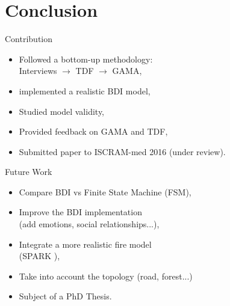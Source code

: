 \documentclass{beamer}
\begin{document}
  \section{Conclusion}

    \begin{frame}{Contribution}
      \begin{itemize}
        \item Followed a bottom-up methodology: \\ \qquad Interviews $\rightarrow$ TDF $\rightarrow$ GAMA,
        \item implemented a realistic BDI model,
				\item Studied model validity,
        \item Provided feedback on GAMA and TDF,
        \item Submitted paper to ISCRAM-med 2016 (under review).
      \end{itemize}
    \end{frame}

    \begin{frame}{Future Work}
      \begin{itemize}
        \item Compare BDI vs Finite State Machine (FSM),
        \item Improve the BDI implementation \\ \qquad (add emotions, social relationships...),
				\item Integrate a more realistic fire model \\ \qquad (SPARK \cite{Miller2015}),
				\item Take into account the topology (road, forest...)
        \item Subject of a PhD Thesis.
      \end{itemize}
    \end{frame}
\end{document}
